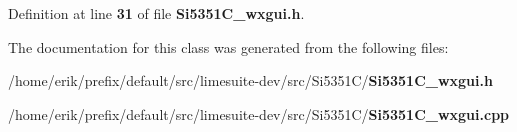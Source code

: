 Definition at line {\bf 31} of file {\bf Si5351\+C\+\_\+wxgui.\+h}.



The documentation for this class was generated from the following files\+:\begin{DoxyCompactItemize}
\item 
/home/erik/prefix/default/src/limesuite-\/dev/src/\+Si5351\+C/{\bf Si5351\+C\+\_\+wxgui.\+h}\item 
/home/erik/prefix/default/src/limesuite-\/dev/src/\+Si5351\+C/{\bf Si5351\+C\+\_\+wxgui.\+cpp}\end{DoxyCompactItemize}
